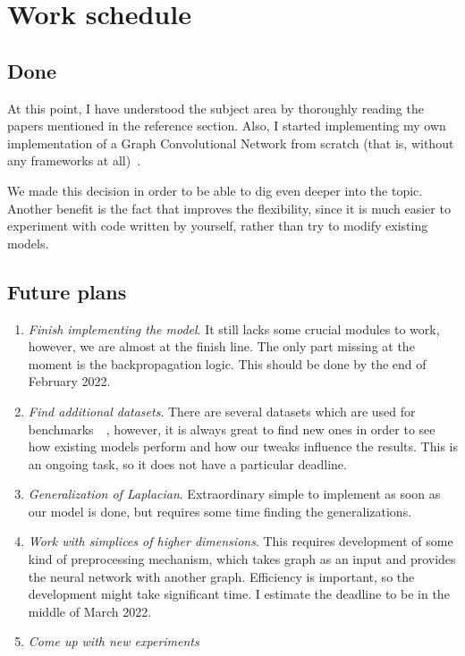 \section{Work schedule}

\subsection{Done}

At this point, I have understood the subject area by thoroughly reading the papers mentioned in the reference section.
Also, I started implementing my own implementation of a Graph Convolutional Network from scratch (that is, without any frameworks at all)~\cite{gcn_implementation}.

We made this decision in order to be able to dig even deeper into the topic.
Another benefit is the fact that improves the flexibility, since it is much easier to experiment with code written by yourself, rather than try to modify existing models.

\subsection{Future plans}

\begin{enumerate}
	\item \textit{Finish implementing the model}.
	      It still lacks some crucial modules to work, however, we are almost at the finish line.
	      The only part missing at the moment is the backpropagation logic.
	      This should be done by the end of February 2022.

	\item \textit{Find additional datasets}.
	      There are several datasets which are used for benchmarks~\cite{cora_dataset}~\cite{karate_club_dataset}, however, it is always great to find new ones in order to see how existing models perform and how our tweaks influence the results.
	      This is an ongoing task, so it does not have a particular deadline.

	\item \textit{Generalization of Laplacian}.
	      Extraordinary simple to implement as soon as our model is done, but requires some time finding the generalizations.

	\item \textit{Work with simplices of higher dimensions}.
	      This requires development of some kind of preprocessing mechanism, which takes graph as an input and provides the neural network with another graph.
	      Efficiency is important, so the development might take significant time.
	      I estimate the deadline to be in the middle of March 2022.

	\item \textit{Come up with new experiments}
\end{enumerate}